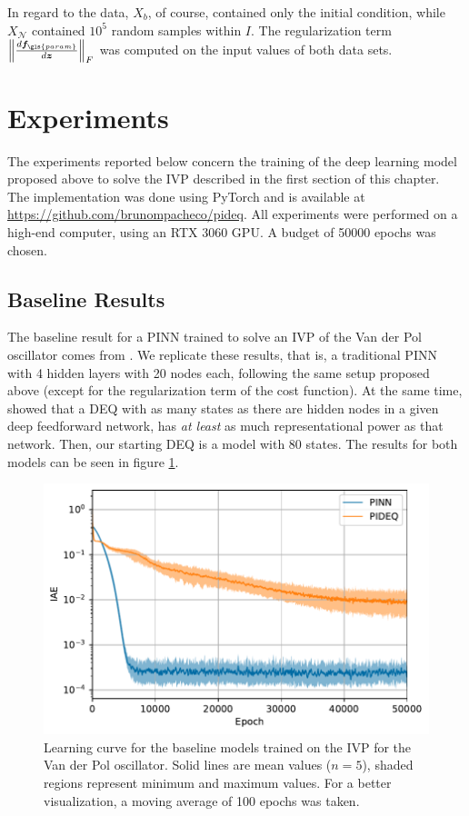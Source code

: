 In regard to the data, $X_b$, of course, contained only the initial condition, while $X_{\mathcal{N}}$ contained $10^5$ random samples within $I$.
The regularization term $\left\lVert \frac{d \bm{f}_{\gls{param}}}{d \bm{z}}\right\rVert_F$ was computed on the input values of both data sets.

\section{Experiments}

The experiments reported below concern the training of the deep learning model proposed above to solve the \gls{IVP} described in the first section of this chapter.
The implementation was done using PyTorch \cite{paszke_pytorch_2019} and is available at \url{https://github.com/brunompacheco/pideq}.
All experiments were performed on a high-end computer, using an RTX 3060 GPU.
A budget of 50000 epochs was chosen.

\subsection{Baseline Results}

The baseline result for a \gls{PINN} trained to solve an \gls{IVP} of the Van der Pol oscillator comes from \textcite{Antonelo2021}.
We replicate these results, that is, a traditional \gls{PINN} with 4 hidden layers with 20 nodes each, following the same setup proposed above (except for the regularization term of the cost function).
At the same time, \textcite{Ghaoui2019} showed that a \gls{DEQ} with as many states as there are hidden nodes in a given deep feedforward network, has \emph{at least} as much representational power as that network.
Then, our starting \gls{DEQ} is a model with 80 states.
The results for both models can be seen in figure \ref{fig:baseline-iae}.

\begin{figure}[h]
    \centering
	\includegraphics{images/exp_1_iae.pdf}
    \caption{Learning curve for the baseline models trained on the \gls{IVP} for the Van der Pol oscillator. Solid lines are mean values ($n=5$), shaded regions represent minimum and maximum values. For a better visualization, a moving average of 100 epochs was taken.}
    \label{fig:baseline-iae}
\end{figure}

